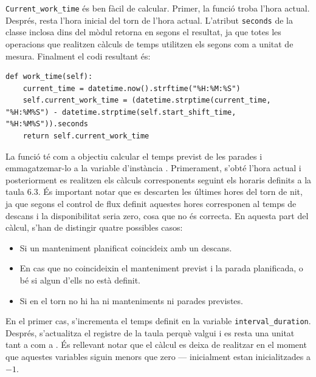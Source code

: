 \documentclass{tfgitic}[2022/06/30]
\begin{document}
\texttt{Current\_work\_time} és ben fàcil de calcular. Primer, la funció  troba l'hora actual. Després, resta l'hora inicial del torn de l'hora actual. L'atribut \texttt{seconds} de la classe  inclosa dins del mòdul  retorna en segons el resultat, ja que totes les operacions que realitzen càlculs de temps utilitzen els segons com a unitat de mesura. Finalment el codi resultant és:

\begin{lstlisting}[style = Python]
def work_time(self):
    current_time = datetime.now().strftime("%H:%M:%S")
    self.current_work_time = (datetime.strptime(current_time, "%H:%M%S") - datetime.strptime(self.start_shift_time, "%H:%M%S")).seconds
    return self.current_work_time
\end{lstlisting}

La funció  té com a objectiu calcular el temps previst de les parades i emmagatzemar-lo a la variable d'instància . Primerament, s'obté l'hora actual i posteriorment es realitzen els càlculs corresponents seguint els horaris definits a la taula 6.3. És important notar que es descarten les últimes hores del torn de nit, ja que segons el control de flux definit aquestes hores corresponen al temps de descans i la disponibilitat seria zero, cosa que no és correcta. En aquesta part del càlcul, s'han de distingir quatre possibles casos:

\begin{itemize}
    \item Si un manteniment planificat coincideix amb un descans.
    \item En cas que no coincideixin el manteniment previst i la parada planificada, o bé si algun d'ells no està definit.
    \item Si en el torn no hi ha ni manteniments ni parades previstes.
\end{itemize}

En el primer cas, s'incrementa  el temps definit en la variable \texttt{interval\_duration}. Després, s'actualitza el registre  de la taula  perquè valgui  i es resta una unitat tant a  com a . És rellevant notar que el càlcul es deixa de realitzar en el moment que aquestes variables siguin menors que zero --- inicialment estan inicialitzades a $-1$.
\end{document}
